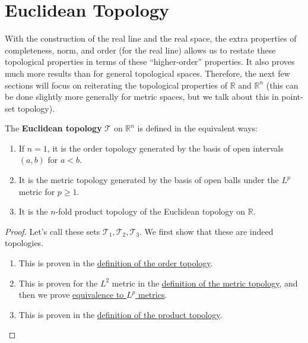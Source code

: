 \section{Euclidean Topology} 

  With the construction of the real line and the real space, the extra properties of completeness, norm, and order (for the real line) allows us to restate these topological properties in terms of these ``higher-order'' properties. It also proves much more results than for general topological spaces. Therefore, the next few sections will focus on reiterating the topological properties of $\mathbb{R}$ and $\mathbb{R}^n$ (this can be done slightly more generally for metric spaces, but we talk about this in point-set topology). 

  \begin{theorem}
    The \textbf{Euclidean topology} $\mathscr{T}$ on $\mathbb{R}^n$ is defined in the equivalent ways: 
    \begin{enumerate}
      \item If $n = 1$, it is the order topology generated by the basis of open intervals $(a, b)$ for $a < b$. 
      \item It is the metric topology generated by the basis of open balls under the $L^p$ metric for $p \geq 1$. 
      \item It is the $n$-fold product topology of the Euclidean topology on $\mathbb{R}$. 
    \end{enumerate}
  \end{theorem}
  \begin{proof} 
    Let's call these sets $\mathscr{T}_1, \mathscr{T}_2, \mathscr{T}_3$. We first show that these are indeed topologies. 
    \begin{enumerate}
      \item This is proven in the \hyperref[pst-def:order-topology]{definition of the order topology}. 
      \item This is proven for the $L^2$ metric in the \hyperref[pst-def:metric-topology]{definition of the metric topology}, and then we prove \hyperref[pst-thm:lp-norms-euclidean-topology]{equivalence to $L^p$ metrics}. 
      \item This is proven in the \hyperref[pst-def:product-topology]{definition of the product topology}. 
    \end{enumerate}
  \end{proof}

